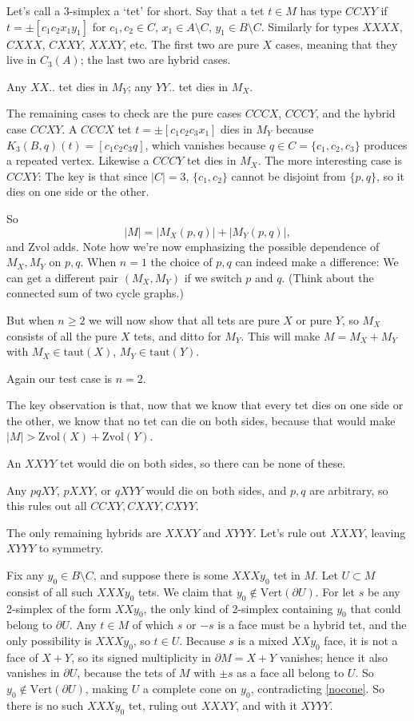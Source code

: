 \documentclass[12pt]{article}
\def\del{\partial}
\newcommand{\kw}{\mathrm}
\newcommand{\vertices}{\kw{Vert}}
\newcommand{\taut}{\kw{taut}}
\newcommand{\Zvol}{\kw{Zvol}}
\begin{document}
Let's call a $3$-simplex a `tet' for short.
Say that a tet $t \in M$ has type $CCXY$ if $t= \pm[c_1c_2x_1y_1]$
for $c_1,c_2 \in C$, $x_1 \in A \setminus C$, $y_1 \in B \setminus C$.
Similarly for types $XXXX$, $CXXX$, $CXXY$, $XXXY$, etc.
The first two are pure $X$ cases, meaning that they live in $C_3(A)$;
the last two are hybrid cases.

Any $XX..$ tet dies in $M_Y$;
any $YY..$ tet dies in $M_X$.

The remaining cases to check are
the pure cases $CCCX$, $CCCY$,
and the hybrid case $CCXY$.
A $CCCX$ tet $t=\pm[c_1c_2c_3x_1]$ dies in $M_Y$ because
$K_3(B,q)(t)=[c_1c_2c_3q]$,
which vanishes because $q \in C = \{c_1,c_2,c_3\}$ produces a repeated vertex.
Likewise a $CCCY$ tet dies in $M_X$.
The more interesting case is $CCXY$:
The key is that since $|C|=3$, $\{c_1,c_2\}$ cannot be disjoint from $\{p,q\}$,
so it dies on one side or the other.

So 
\[
|M| = |M_X(p,q)| + |M_Y(p,q)|,
\]
and $\Zvol$ adds.
Note how we're now emphasizing the possible dependence of $M_X,M_Y$ on $p,q$.
When $n=1$ the choice of $p,q$ can indeed make a difference:
We can get a different pair $(M_X,M_Y)$ if we switch
$p$ and $q$.
(Think about the connected sum of two cycle graphs.)

But when $n \geq 2$ we will now show that all tets are pure $X$ or pure $Y$,
so $M_X$ consists of all the pure $X$ tets, and ditto for $M_Y$.
This will make
$M = M_X + M_Y$ with $M_X \in \taut(X)$, $M_Y \in \taut(Y)$.

Again our test case is $n=2$.

The key observation is that, now that we know that every tet dies on
one side or the other, we know that no tet can die on both sides,
because that would make $|M| > \Zvol(X) + \Zvol(Y)$.

An $XXYY$ tet would die on both sides, so there can be none of these.

Any $pqXY$, $pXXY$, or $qXYY$ would die on both sides, and $p,q$ are arbitrary,
so this rules out all $CCXY,CXXY,CXYY$.

The only remaining hybrids are $XXXY$ and $XYYY$.
Let's rule out $XXXY$, leaving $XYYY$ to symmetry.

Fix any $y_0 \in B \setminus C$, and suppose there is
some $XXXy_0$ tet in $M$.
Let $U \subset M$ consist of all such $XXXy_0$ tets.
We claim that $y_0 \notin \vertices(\del U)$.
For let $s$ be any 2-simplex of the form $XXy_0$,
the only kind of 2-simplex containing $y_0$ that could belong
to $\del U$.
Any $t \in M$ of which $s$ or $-s$ is a face must be a hybrid tet,
and the only possibility is $XXXy_0$, so $t \in U$.
Because $s$ is a mixed $XXy_0$ face, it is not a face of $X+Y$, so its
signed multiplicity in $\del M = X+Y$ vanishes;
hence it also vanishes in $\del U$,
because the tets of $M$ with $\pm s$ as a face all belong to $U$.
So $y_0 \notin \vertices(\del U)$,
making $U$ a complete cone on $y_0$,
contradicting \ref{nocone}.
So there is no such $XXXy_0$ tet, ruling out $XXXY$,
and with it $XYYY$.
\end{document}
